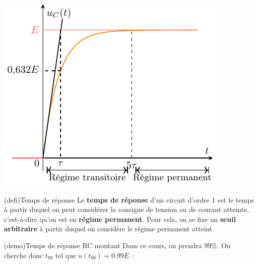 \documentclass[../../main/main.tex]{subfiles}
\begin{document}
\begin{tcb*}[label=impl:déterm, sidebyside, righthand ratio=.4]
{	}{%
		\includegraphics[width=\linewidth]{carac_rc-tau}
	}%
\end{tcb*}
\begin{tcb*}(defi){Temps de réponse}
	Le \textbf{temps de réponse} d'un circuit d'ordre 1 est le temps à partir
	duquel on peut considérer la consigne de tension ou de courant atteinte,
	c'est-à-dire qu'on est en \textbf{régime permanent}.
	\smallbreak
	Pour cela, on se fixe un \textbf{seuil arbitraire} à partir duquel on
	considère le régime permanent atteint.
\end{tcb*}

\begin{tcb*}(demo){Temps de réponse RC montant}
	Dans ce cours, on prendra $99\%$. On cherche donc $t_{99}$ tel que $u(t_{99}) =
		\num{0.99}E$~:
	\vspace{-15pt}
\end{tcb*}
\end{document}
